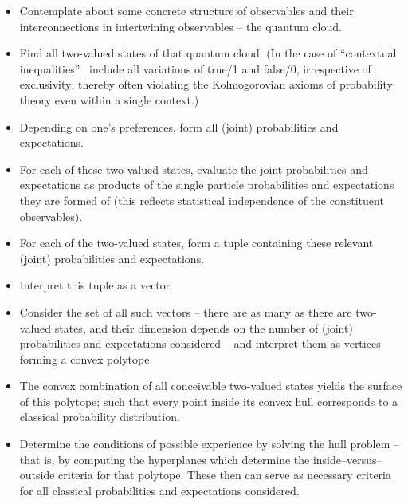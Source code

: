 \documentclass[%
  twocolumn,
 showpacs,
 showkeys,
 preprintnumbers,
 amsmath,amssymb,
 aps,
  pra,
  longbibliography,
 ]{revtex4-1}
\begin{document}
\begin{itemize}
\item
Contemplate about some concrete structure of observables and their interconnections in intertwining observables -- the quantum cloud.

\item
Find all two-valued states of that quantum cloud.
(In the case of ``contextual inequalities''~\citep{cabello:210401}
include all variations of true/1 and false/0, irrespective of exclusivity;
thereby often violating the Kolmogorovian axioms of probability theory even within a single context.)

\item
Depending on one's preferences, form all (joint) probabilities and expectations.

\item
For each of these two-valued states, evaluate the
joint  probabilities and expectations  as  products of the single particle probabilities and expectations they are formed of
(this reflects statistical independence of the constituent observables).

\item
For each of the two-valued states,
form a tuple containing these relevant (joint) probabilities and expectations.

\item
Interpret this tuple as a vector.

\item
Consider the set of all such vectors -- there are as many as there are two-valued states, and their dimension depends on the number of
(joint) probabilities and expectations considered -- and interpret them as vertices forming a convex polytope.


\item
The convex combination of all conceivable two-valued states yields the surface of this polytope;
such that every point inside its convex hull corresponds to a classical probability distribution.

\item
Determine the conditions of possible experience
by solving the hull problem -- that is, by computing the hyperplanes which determine the inside--versus--outside criteria for that polytope.
These then can serve as necessary criteria for all classical probabilities and expectations considered.

\end{itemize}
\end{document}
